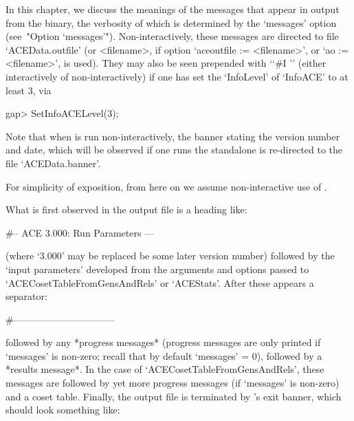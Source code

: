 

In this chapter, we discuss the meanings of the messages  that  appear
in output from the {\ACE} binary, the verbosity of which is determined
by the `messages' option (see~"Option `messages'"). Non-interactively,
these messages are directed to file `ACEData.outfile' (or  <filename>,
if option `aceoutfile := <filename>', or `ao := <filename>', is used).
They  may  also  be  seen  prepended   with   \lq{}`\#I   ''   (either
interactively of non-interactively) if one has set the `InfoLevel'  of
`InfoACE' to  at least 3, via

\beginexample
gap> SetInfoACELevel(3);
\endexample

Note that when {\ACE} is run non-interactively, the banner stating the
version number and date, which  will  be  observed  if  one  runs  the
standalone is re-directed to the file `ACEData.banner'.

For simplicity of exposition, from here on we  assume  non-interactive
use of {\ACE}.

What is first observed in the {\ACE} output file is a heading like:

\begintt
  #-- ACE 3.000: Run Parameters ---
\endtt

(where `3.000' may be replaced be some later version number)  followed
by the \lq{}input parameters' developed from the arguments and options
passed to `ACECosetTableFromGensAndRels' or  `ACEStats'.  After  these
appears a separator:

\begintt
  #--------------------------------
\endtt

followed by  any  *progress  messages*  (progress  messages  are  only
printed if `messages' is non-zero; recall that by default `messages' =
0),   followed   by   a   *results   message*.   In   the   case    of
`ACECosetTableFromGensAndRels', these messages  are  followed  by  yet
more progress messages (if `messages' is non-zero) and a coset  table.
Finally, the {\ACE} output file is terminated by {\ACE}'s exit banner,
which should look something like:

